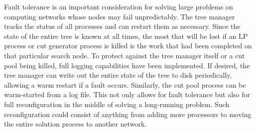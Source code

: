 Fault tolerance is an important consideration for solving large
problems on computing networks whose nodes may fail unpredictably. The
tree manager tracks the status of all processes and can restart them
as necessary. Since the state of the entire tree is known at all
times, the most that will be lost if an LP process or cut generator
process is killed is the work that had been completed on that
particular search node. To protect against the tree manager itself or
a cut pool being killed, full logging capabilities have been
implemented. If desired, the tree manager can write out the entire
state of the tree to disk periodically, allowing a warm restart if a
fault occurs. Similarly, the cut pool process can be warm-started from
a log file. This not only allows for fault tolerance but also for full
reconfiguration in the middle of solving a long-running problem. Such
reconfiguration could consist of anything from adding more processors
to moving the entire solution process to another network.

